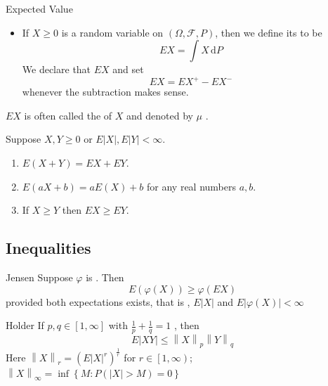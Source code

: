 \documentclass[../main.tex]{subfiles}
\begin{document}
\begin{definition}{Expected Value}{}
    \begin{itemize}
        \item If \(  X\ge 0  \) is a random variable on \(  \left(  \Omega ,\mathcal{F},P \right)   \), then we define its to be \[
        EX= \int X\,\mathrm{d} P
        \] We declare that \(  EX  \)  and set \[
        EX = EX^{+ }-EX^{-}
        \]whenever the subtraction makes sense.    
    \end{itemize}
    
\end{definition}
\begin{remark}
    \(  EX  \) is often called the  of \(  X  \) and denoted by \(  \mu   \) .    
\end{remark}
\begin{theorem}{}{}
Suppose $X, Y \ge 0$ or $E|X|, E|Y| < \infty$.
\begin{enumerate}
    \item[(a)] $E(X + Y) = EX + EY$.
    \item[(b)] $E(aX + b) = aE(X) + b$ for any real numbers $a, b$.
    \item[(c)] If $X \ge Y$ then $EX \ge EY$.
\end{enumerate}
\end{theorem}

\subsection{Inequalities}

\begin{theorem}{Jensen}{}
    Suppose \(   \varphi   \) is . Then \[
    E\left(  \varphi \left( X \right)  \right)\ge  \varphi \left( EX \right)  
    \] provided both expectations exists, that is , \(  E\left| X \right|    \) and \(  E\left|  \varphi \left( X \right)  \right|< \infty   \)   
\end{theorem}

\begin{theorem}{Holder}{}
    If \(  p,q\in \left[ 1,\infty \right]   \) with \(  \frac{1}{p}+ \frac{1}{q}= 1  \) , then \[
    E\left| XY \right|\le \left\| X \right\|_{p}\left\| Y \right\|_{q} 
    \] Here \(  \left\| X \right\|_{r}= \left( E\left| X \right|^{r}  \right)^{\frac{1}{r}}   \)    for \(  r\in \left[ 1,\infty \right)   \); \(  \left\| X \right\|_{\infty}= \inf \left\{ M:P\left( \left| X \right|> M  \right)  = 0\right\}  \)  
\end{theorem}
\end{document}
